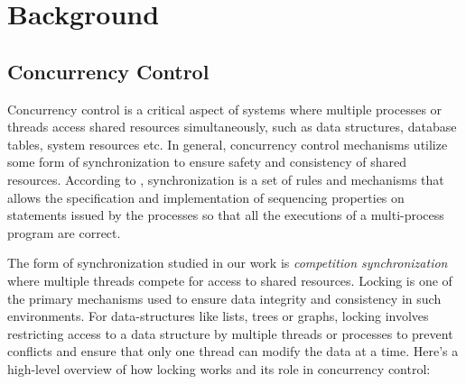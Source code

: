 %

\chapter{Background} \label{chap:background}
\section{Concurrency Control}

Concurrency control is a critical aspect of systems where multiple processes or threads access shared resources simultaneously, such as data structures, database tables, system resources etc. 
In general, concurrency control mechanisms utilize some form of synchronization to ensure safety and consistency of shared resources. 
According to \citet{DBLP:books/daglib/0030596}, synchronization is a set of rules and mechanisms that allows the specification and implementation of sequencing properties on statements issued by the processes so that all the executions of a multi-process program are correct. 

The form of synchronization studied in our work is \emph{competition synchronization} where multiple threads compete for access to shared resources. 
Locking is one of the primary mechanisms used to ensure data integrity and consistency in such environments.
For data-structures like lists, trees or graphs, locking involves restricting access to a data structure by multiple threads or processes to prevent conflicts and ensure that only one thread can modify the data at a time. Here’s a high-level overview of how locking works and its role in concurrency control:





